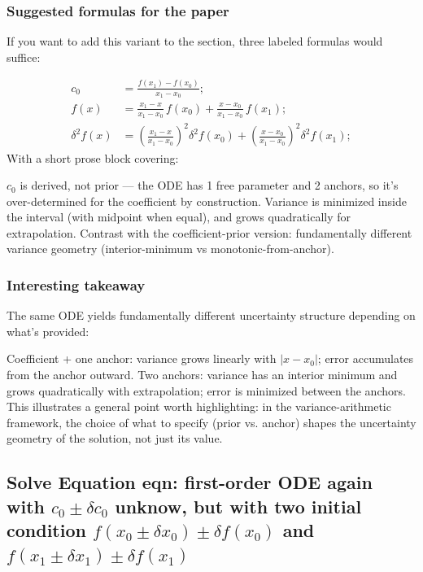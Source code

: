 \documentclass[twoside]{article}
\numberwithin{equation}{section}
\begin{document}
\subsubsection{Suggested formulas for the paper}
If you want to add this variant to the section, three labeled formulas would suffice:


\begin{align}
\label{eqn: first-order ODE two anchors slope}
c_0 &= \frac{f(x_1) - f(x_0)}{x_1 - x_0}; \\
\label{eqn: first-order ODE two anchors solution}
f(x) &= \frac{x_1 - x}{x_1 - x_0}\, f(x_0) + \frac{x - x_0}{x_1 - x_0}\, f(x_1); \\
\label{eqn: first-order ODE two anchors variance}
\delta^2 f(x) &= \left(\frac{x_1 - x}{x_1 - x_0}\right)^2 \delta^2 f(x_0) + \left(\frac{x - x_0}{x_1 - x_0}\right)^2 \delta^2 f(x_1);
\end{align}
With a short prose block covering:

$c_0$ is derived, not prior — the ODE has 1 free parameter and 2 anchors, so it's over-determined for the coefficient by construction.
Variance is minimized inside the interval (with midpoint when equal), and grows quadratically for extrapolation.
Contrast with the coefficient-prior version: fundamentally different variance geometry (interior-minimum vs monotonic-from-anchor).
\subsubsection{Interesting takeaway}
The same ODE yields fundamentally different uncertainty structure depending on what's provided:

Coefficient + one anchor: variance grows linearly with $|x - x_0|$; error accumulates from the anchor outward.
Two anchors: variance has an interior minimum and grows quadratically with extrapolation; error is minimized between the anchors.
This illustrates a general point worth highlighting: in the variance-arithmetic framework, the choice of what to specify (prior vs. anchor) shapes the uncertainty geometry of the solution, not just its value.

\subsection{Solve Equation {eqn: first-order ODE} again with $c_0 \pm \delta c_0$ unknow, but with two initial condition $f(x_0 \pm \delta x_0) \pm \delta f(x_0)$ and $f(x_1 \pm \delta x_1) \pm \delta f(x_1)$}
\end{document}
